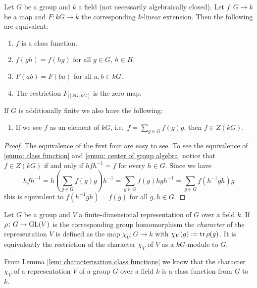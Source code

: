 \begin{lem} \label{lem: characterisation class functions}
  Let $G$ be a group and $k$ a field (not necessarily algebraically closed). Let $f \colon G \to k$ be a map and $F \colon kG \to k$ the corresponding $k$-linear extension. Then the following are equivalent:
  \begin{enumerate}[label=\emph{\roman*)}, leftmargin=*]
    \item \label{enum: class function}
      $f$ is a class function.
    \item
      $f(gh) = f(hg)$ for all $g \in G$, $h \in H$.
    \item
      $F(ab) = F(ba)$ for all $a, b \in kG$.
    \item
      The restriction $F_{|[kG,kG]}$ is the zero map.
  \end{enumerate}
  If $G$ is additionally finite we also have the following:
  \begin{enumerate}[label=\emph{\roman*)}, leftmargin=*, resume]
    \item \label{enum: center of group algebra}
      If we see $f$ as an element of $kG$, i.e.\ $f = \sum_{g \in G} f(g) g$, then $f \in Z(kG)$.
  \end{enumerate}
\end{lem}
\begin{proof}
  The equivalence of the first four are easy to see. To see the equivalence of \ref{enum: class function} and \ref{enum: center of group algebra} notice that $f \in Z(kG)$ if and only if $hfh^{-1} = f$ for every $h \in G$. Since we have
    \[
      h f h^{-1}
      = h\left( \sum_{g \in G} f(g) g \right) h^{-1}
      = \sum_{g \in G} f(g) hgh^{-1}
      = \sum_{g \in G} f(h^{-1} g h) g
    \]
    this is equivalent to $f(h^{-1} g h) = f(g)$ for all $g, h \in G$.
\end{proof}


\begin{defi}
  Let $G$ be a group and $V$ a finite-dimensional representation of $G$ over a field $k$. If $\rho \colon G \to \operatorname{GL}(V)$ is the corresponding group homomorphism the \emph{character} of the representation $V$ is defined as the map $\chi_V \colon G \to k$ with $\chi_V(g) \coloneqq \operatorname{tr} \rho(g)$. It is equivalently the restriction of the character $\chi_V$ of $V$ as a $kG$-module to $G$.
\end{defi}


From Lemma \ref{lem: characterisation class functions} we know that the character $\chi_V$ of a representation $V$ of a group $G$ over a field $k$ is a class function from $G$ to $k$.



